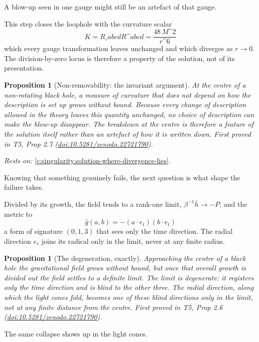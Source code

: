\documentclass[11pt]{article}
\newtheorem{proposition}[theorem]{Proposition}
\theoremstyle{definition}
\theoremstyle{plain}
\providecommand{\er}{}\renewcommand{\er}{e_r}
\providecommand{\et}{}\renewcommand{\et}{e_t}
\providecommand{\hb}{}\renewcommand{\hb}{\bar{h}}
\begin{document}
A blow-up seen in one gauge might still be an artefact of that gauge.

This step closes the loophole with the curvature scalar \[ K = R\_{abcd}R\^{}{abcd} = \frac{48\,M\^{}2}{r\^{}6} \] which every gauge transformation leaves unchanged and which diverges as $r \to 0$. The division-by-zero locus is therefore a property of the solution, not of its presentation.

\begin{proposition}[Non-removability: the invariant argument]\label{c:singularity.non-removability-invariant-argument}
At the centre of a non-rotating black hole, a measure of curvature that does not depend on how the description is set up grows without bound. Because every change of description allowed in the theory leaves this quantity unchanged, no choice of description can make the blow-up disappear. The breakdown at the centre is therefore a feature of the solution itself rather than an artefact of how it is written down.
\emph{First proved in} T5, Prop 2.7 (\href{https://doi.org/10.5281/zenodo.22721790}{doi:10.5281/zenodo.22721790}).
\end{proposition}
\noindent\emph{Rests on:} \ref{c:singularity.solution-where-divergence-lies}.

Knowing that something genuinely fails, the next question is what shape the failure takes.

Divided by its growth, the field tends to a rank-one limit, $\beta^{-1}\hb \to -P$, and the metric to \[ \hat g(a,b) = -(a\cdot\et)(b\cdot\et) \] a form of signature $(0,1,3)$ that sees only the time direction. The radial direction $\er$ joins its radical only in the limit, never at any finite radius.

\begin{proposition}[The degeneration, exactly]\label{c:singularity.degeneration-exactly}
Approaching the centre of a black hole the gravitational field grows without bound, but once that overall growth is divided out the field settles to a definite limit. The limit is degenerate: it registers only the time direction and is blind to the other three. The radial direction, along which the light cones fold, becomes one of these blind directions only in the limit, not at any finite distance from the centre.
\emph{First proved in} T5, Prop 2.6 (\href{https://doi.org/10.5281/zenodo.22721790}{doi:10.5281/zenodo.22721790}).
\end{proposition}

The same collapse shows up in the light cones.
\end{document}
